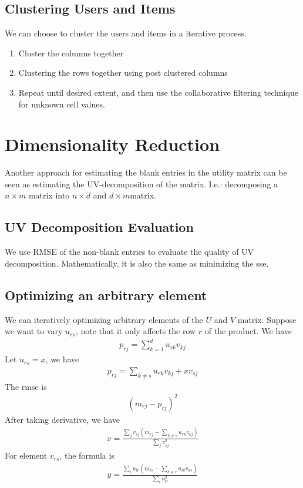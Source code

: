 \subsection{Clustering Users and Items} 
We can choose to cluster the users and items in a iterative process. 
    \begin{enumerate}
        \item Cluster the columns together
        \item Clustering the rows together using post clustered columns 
        \item Repeat until desired extent, and then use the collaborative filtering technique for unknown cell values. 
    \end{enumerate}
    
\section{Dimensionality Reduction} 
Another approach for estimating the blank entries in the utility matrix can be seen as estimating the UV-decomposition of the matrix. I.e.: decomposing a $n \times m$ matrix into $n \times d$ and $d \times m $matrix. 
\subsection{UV Decomposition Evaluation} 
We use RMSE of the non-blank entries to evaluate the quality of UV decomposition. Mathematically, it is also the same as minimizing the sse. 

\subsection{Optimizing an arbitrary element} 
We can iteratively optimizing arbitrary elements of the $U$ and $V$ matrix. Suppose we want to vary $u_{rs}$, note that it only affects the row $r$ of the product. We have 
    \begin{align*}
        p_{rj} = \sum_{k=1}^d u_{rk} v_{kj}
    \end{align*}
Let $u_{rs} = x$, we have 
    \begin{align*}
        p_{rj} = \sum_{k\neq s}u_{rk} v_{kj}  + x v_{sj}
    \end{align*}
The rmse is 
    \begin{align*}
        (m_{rj} - p_{rj})^2 
    \end{align*}
After taking derivative, we have 
    \begin{align*}
        x = \frac{\sum_j v_{sj} (m_{rj} - \sum_{k \neq s} u_{rk} v_{kj})}{\sum_j v^2_{sj}}
    \end{align*}
For element $v_{rs}$, the formula is 
    \begin{align*}
        y = \frac{\sum_i u_{ir} (m_{is} - \sum_{k \neq r} u_{ik} v_{ks})}{\sum_i u^2_{ir}}
    \end{align*}
    
